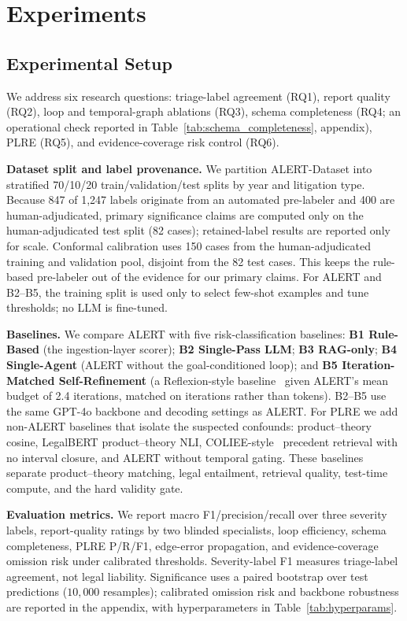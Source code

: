 
\section{Experiments}
\label{sec:evaluation}

\subsection{Experimental Setup}

We address six research questions: triage-label agreement (RQ1), report quality (RQ2), loop and temporal-graph ablations (RQ3), schema completeness (RQ4; an operational check reported in Table~\ref{tab:schema_completeness}, appendix), PLRE (RQ5), and evidence-coverage risk control (RQ6).

\textbf{Dataset split and label provenance.} We partition ALERT-Dataset into stratified 70/10/20 train/validation/test splits by year and litigation type. Because 847 of 1{,}247 labels originate from an automated pre-labeler and 400 are human-adjudicated, primary significance claims are computed only on the human-adjudicated test split (82 cases); retained-label results are reported only for scale. Conformal calibration uses 150 cases from the human-adjudicated training and validation pool, disjoint from the 82 test cases. This keeps the rule-based pre-labeler out of the evidence for our primary claims. For ALERT and B2--B5, the training split is used only to select few-shot examples and tune thresholds; no LLM is fine-tuned.

\textbf{Baselines.} We compare ALERT with five risk-classification baselines: \textbf{B1 Rule-Based} (the ingestion-layer scorer); \textbf{B2 Single-Pass LLM}; \textbf{B3 RAG-only}; \textbf{B4 Single-Agent} (ALERT without the goal-conditioned loop); and \textbf{B5 Iteration-Matched Self-Refinement} (a Reflexion-style baseline~\citep{shinn2023reflexion} given ALERT's mean budget of 2.4 iterations, matched on iterations rather than tokens). B2--B5 use the same GPT-4o backbone and decoding settings as ALERT. For PLRE we add non-ALERT baselines that isolate the suspected confounds: product--theory cosine, LegalBERT product--theory NLI, COLIEE-style~\citep{rabelo2022coliee} precedent retrieval with no interval closure, and ALERT without temporal gating. These baselines separate product--theory matching, legal entailment, retrieval quality, test-time compute, and the hard validity gate.

\textbf{Evaluation metrics.} We report macro F1/precision/recall over three severity labels, report-quality ratings by two blinded specialists, loop efficiency, schema completeness, PLRE P/R/F1, edge-error propagation, and evidence-coverage omission risk under calibrated thresholds. Severity-label F1 measures triage-label agreement, not legal liability. Significance uses a paired bootstrap over test predictions ($10{,}000$ resamples); calibrated omission risk and backbone robustness are reported in the appendix, with hyperparameters in Table~\ref{tab:hyperparams}.

